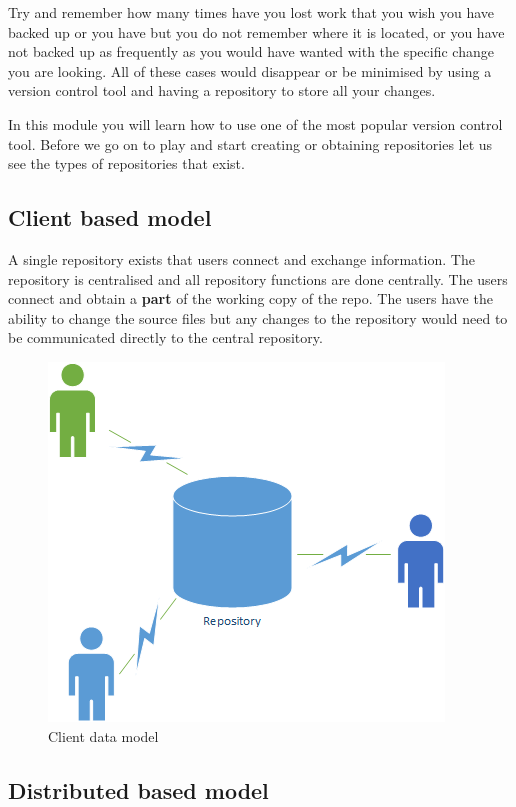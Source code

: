 \documentclass[
]{book}
\begin{document}
Try and remember how many times have you lost work that you wish you have backed up or you have but you do not remember where it is located, or you have not backed up as frequently as you would have wanted with the specific change you are looking. All of these cases would disappear or be minimised by using a version control tool and having a repository to store all your changes.

In this module you will learn how to use one of the most popular version control tool. Before we go on to play and start creating or obtaining repositories let us see the types of repositories that exist.

\hypertarget{client-based-model}{%
\subsection{Client based model}\label{client-based-model}}

A single repository exists that users connect and exchange information. The repository is centralised and all repository functions are done centrally. The users connect and obtain a \textbf{part} of the working copy of the repo. The users have the ability to change the source files but any changes to the repository would need to be communicated directly to the central repository.

\begin{figure}

{\centering \includegraphics[width=0.6\linewidth]{images/Client Data Model Example} 

}

\caption{Client data model}\label{fig:unnamed-chunk-3}
\end{figure}

\hypertarget{distributed-based-model}{%
\subsection{Distributed based model}\label{distributed-based-model}}
\end{document}
